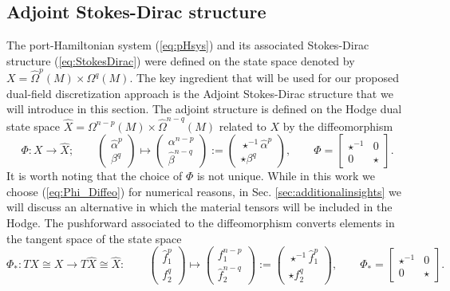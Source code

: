 \documentclass{elsarticle}
\newcommand{\revTwo}[1]{{\color{black}#1}}
\newcommand*{\dual}[1]{\ensuremath{\widehat{#1}}}
\begin{document}
\subsection{Adjoint Stokes-Dirac structure \label{sec:asds}}
\revTwo{
The port-Hamiltonian system (\ref{eq:pHsys}) and its associated Stokes-Dirac structure (\ref{eq:StokesDirac}) were defined on the state space denoted by $X = \dual{\Omega}^p(M) \times \Omega^q(M)$. The key ingredient that will be used for our proposed dual-field discretization approach is the Adjoint Stokes-Dirac structure that we will introduce in this section. The adjoint structure is defined on the Hodge dual state space $\dual{X} = \Omega^{n-p}(M) \times \dual{\Omega}^{n-q}(M)$ related to $X$ by the diffeomorphism}
\begin{equation}\label{eq:Phi_Diffeo}
	\Phi:
	X \rightarrow \dual{X} ; \qquad
	\begin{pmatrix}
	\dual{\alpha}^p \\    
	\beta^{q}
	\end{pmatrix}
	\mapsto 
	\begin{pmatrix}
	{\alpha}^{n-p} \\    
	\dual{\beta}^{n-q}
	\end{pmatrix} :=
	\begin{pmatrix}
	\star^{-1}\dual{\alpha}^p \\    
	\star \beta^{q}
	\end{pmatrix}, \qquad \Phi = 
	\begin{bmatrix}
        \star^{-1} & 0 \\
        0 & \star 
    \end{bmatrix}.
\end{equation}
It is worth noting that the choice of $\Phi$ is not unique. While in this work we choose (\ref{eq:Phi_Diffeo}) for numerical reasons, in Sec. \ref{sec:additionalinsights} we will discuss an alternative \revTwo{in which the material tensors will be included in the Hodge.}
The pushforward associated to the diffeomorphism converts elements in the tangent space of the state space
\begin{equation}\label{eq:pushfor_phi}
\Phi_* : T X \cong {X} \rightarrow T \dual{X} \cong \dual{X}: \qquad  
	\begin{pmatrix}
	\dual{f}^p_1 \\
	f^q_2
	\end{pmatrix}
\mapsto  
    \begin{pmatrix}
    {f}^{n-p}_1\\
    \dual{f}^{n-q}_2
    \end{pmatrix} :=
    \begin{pmatrix}
    \star^{-1} \dual{f}^p_1\\
    \star f^q_2
    \end{pmatrix}, \qquad \Phi_* = \begin{bmatrix}
        \star^{-1} & 0 \\
        0 & \star 
    \end{bmatrix}.
\end{equation}
\end{document}
